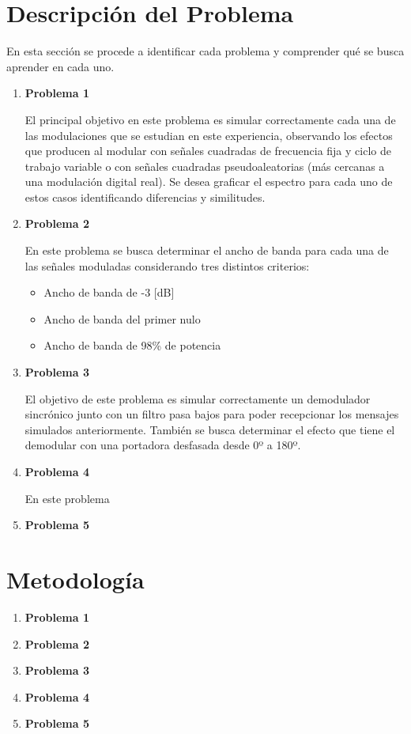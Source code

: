 \documentclass[letterpaper, titlepage]{article}
\begin{document}
\section{Descripción del Problema}
	En esta sección se procede a identificar cada problema y comprender qué se busca aprender en cada uno.
	\begin{enumerate}
		\item \textbf{Problema 1}
		
			El principal objetivo en este problema es simular correctamente cada una de las modulaciones que se estudian en este experiencia, observando los efectos que producen al modular con señales cuadradas de frecuencia fija y ciclo de trabajo variable o con señales cuadradas pseudoaleatorias (más cercanas a una modulación digital real). Se desea graficar el espectro para cada uno de estos casos identificando diferencias y similitudes.
		\item \textbf{Problema 2}
		
			En este problema se busca determinar el ancho de banda para cada una de las señales moduladas considerando tres distintos criterios:
			\begin{itemize}
				\item Ancho de banda de -3 [dB]
				\item Ancho de banda del primer nulo
				\item Ancho de banda de 98\% de potencia
			\end{itemize}
			
		\item \textbf{Problema 3}
		
			El objetivo de este problema es simular correctamente un demodulador sincrónico junto con un filtro pasa bajos para poder recepcionar los mensajes simulados anteriormente. También se busca determinar el efecto que tiene el demodular con una portadora desfasada desde 0º a 180º.
		\item \textbf{Problema 4}
		
			En este problema 
		\item \textbf{Problema 5}
	\end{enumerate}
\newpage

\section{Metodología}
	\begin{enumerate}
		\item \textbf{Problema 1}
		
		\item \textbf{Problema 2}
		
		\item \textbf{Problema 3}
		
		\item \textbf{Problema 4}
		
		\item \textbf{Problema 5}
	\end{enumerate}
\newpage
\newpage
\end{document}
